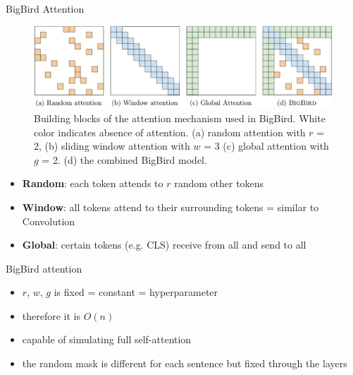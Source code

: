 \documentclass{beamer}
\begin{document}
\begin{frame}{BigBird Attention}

\begin{figure}[h]
\includegraphics[width=\textwidth]{img/attention}
\caption{Building blocks of the attention mechanism used in BigBird. White color indicates absence of attention. (a) random attention with $r$ = 2, (b) sliding window attention with $w$ = 3 (c) global attention with $g$ = 2. (d) the combined BigBird model.}
\end{figure}

\begin{itemize}
\item \textbf{Random}: each token attends to $r$ random other tokens
\item \textbf{Window}: all tokens attend to their surrounding tokens = similar to Convolution
\item \textbf{Global}: certain tokens (e.g. CLS) receive from all and send to all

\end{itemize}

\end{frame}
\begin{frame}{BigBird attention}

\begin{itemize}
\item $r$, $w$, $g$ is fixed = constant = hyperparameter
\item therefore it is $O(n)$
\item capable of simulating full self-attention
\item the random mask is different for each sentence but fixed through the layers
\end{itemize}
\end{frame}
\end{document}
